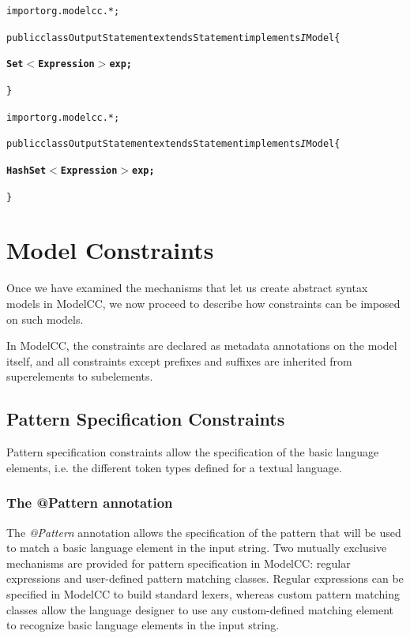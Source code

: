 \documentclass[a4paper,twoside,onecolumn]{article}
\newenvironment{colframe}{%
  \begin{Sbox} 
    \begin{minipage}{.8\columnwidth} 
}{%

  \end{minipage} 
  \end{Sbox} 
  \begin{center} 
    \fcolorbox{black}{MyGray}{\TheSbox} 
  \end{center} 
}
\newcommand{\an}[1]{\emph{#1}} %
\begin{document}
\begin{colframe}
\begin{alltt}
import org.modelcc.*;

public class OutputStatement extends Statement implements{\emph IModel} \{

  {\bf\unskip Set\(<\)Expression\(>\) exp;}

\}
\end{alltt}
\end{colframe}

\begin{colframe}
\begin{alltt}
import org.modelcc.*;

public class OutputStatement extends Statement implements{\emph IModel} \{

  {\bf\unskip HashSet\(<\)Expression\(>\) exp;}

\}
\end{alltt}
\end{colframe}


\section{Model Constraints} \label{sec:modelcons}

Once we have examined the mechanisms that let us create abstract syntax models in ModelCC, we now proceed to describe how constraints can be
imposed on such models.

In ModelCC, the constraints are declared as metadata annotations on the model itself, and all constraints except prefixes and suffixes are inherited from superelements to subelements.

\subsection{Pattern Specification Constraints} \label{sec:patterns}

Pattern specification constraints allow the specification of the basic language elements, i.e. the different token types
defined for a textual language.

\subsubsection{The @Pattern annotation}

The \an{@Pattern} annotation allows the specification of the pattern that will be used to match a basic language element in the input string.
Two mutually exclusive mechanisms are provided for pattern specification in ModelCC: regular expressions and user-defined pattern matching
classes. Regular expressions can be specified in ModelCC to build standard lexers, whereas custom pattern matching classes allow the language
designer to use any custom-defined matching element to recognize basic language elements in the input string.
\end{document}

